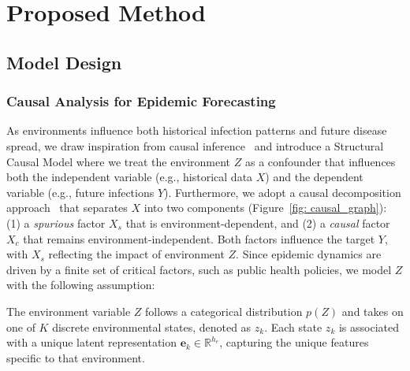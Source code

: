 \section{Proposed Method}



\subsection{Model Design}
\label{sec: model}

\subsubsection{Causal Analysis for Epidemic Forecasting}
As environments influence both historical infection patterns and future disease spread, we draw inspiration from causal inference~\cite{zhou2023causal, jiao2024causal} and introduce a Structural Causal Model where we treat the environment $Z$ as a confounder that influences both the independent variable (e.g., historical data $X$) and the dependent variable (e.g., future infections $Y$). Furthermore, we adopt a causal decomposition approach~\cite{mao2022causal} that separates $X$ into two components (Figure~\ref{fig: causal_graph}): (1) a \textit{spurious} factor $X_s$ that is environment-dependent, and (2) a \textit{causal} factor $X_c$ that remains environment-independent. Both factors influence the target \( Y \), with \( X_s \) reflecting the impact of environment \( Z \). Since epidemic dynamics are driven by a finite set of critical factors, such as public health policies, we model \( Z \) with the following assumption:
\begin{assumption} \label{assumption} The environment variable $Z$ follows a categorical distribution $p(Z)$ and takes on one of $K$ discrete environmental states, denoted as $z_k$. Each state $z_k$ is associated with a unique latent representation $\mathbf{e}_k \in \mathbb{R}^{h_e}$, capturing the unique features specific to that environment.
\end{assumption}

